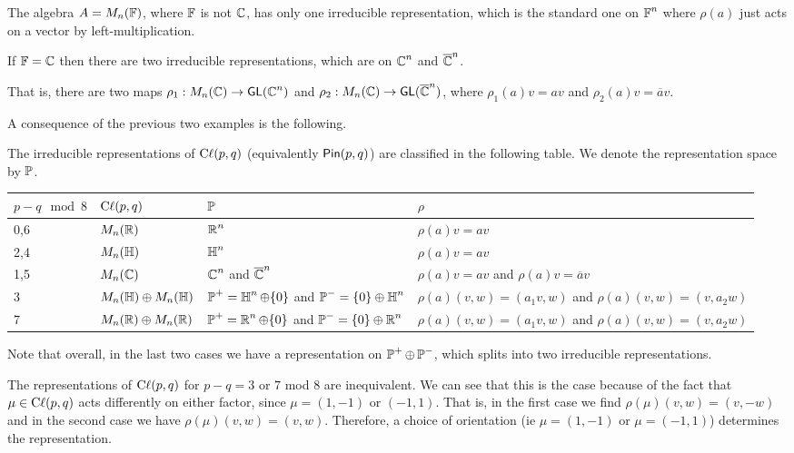 \begin{example}
    The algebra $A = M_n(\operatorname{\mathbb{F}})$, where $\operatorname{\mathbb{F}}$ is not $\operatorname{\mathbb{C}}$, has only one irreducible representation, which is the standard one on $\operatorname{\mathbb{F}}^n$ where $\rho(a)$ just acts on a vector by left-multiplication.
\end{example}
\begin{example}
    If $\operatorname{\mathbb{F}} = \operatorname{\mathbb{C}}$ then there are two irreducible representations, which are on $\operatorname{\mathbb{C}}^n$ and $\overline{\operatorname{\mathbb{C}}}^n$.
    
    That is, there are two maps $\rho_1 : M_n(\operatorname{\mathbb{C}}) \to \operatorname{\textsf{GL}}(\operatorname{\mathbb{C}}^n)$ and $\rho_2 : M_n(\operatorname{\mathbb{C}})\to \operatorname{\textsf{GL}}(\overline{\operatorname{\mathbb{C}}}^n)$, where $\rho_1(a)v = av$ and $\rho_2(a)v=\overline{a}v$.
\end{example}
A consequence of the previous two examples is the following.

\begin{thm} The irreducible representations of $\operatorname{C\ell}(p,q)$ (equivalently $\operatorname{\textsf{Pin}}(p,q)$) are classified in the following table. We denote the representation space by $\operatorname{\mathbb{P}}$.
\begin{center}
\begin{tabular}{llll}
$p-q\mod 8$ & $\operatorname{C\ell}(p,q)$                & $\operatorname{\mathbb{P}}$                          & $\rho$                                              \\ \hline
0,6         & $M_n(\operatorname{\mathbb{R}})$                & $\operatorname{\mathbb{R}}^n$                        & $\rho(a)v=av$                                       \\
2,4         & $M_n(\operatorname{\mathbb{H}})$                & $\operatorname{\mathbb{H}}^n$                        & $\rho(a)v=av$                                       \\
1,5         & $M_n(\operatorname{\mathbb{C}})$                & $\operatorname{\mathbb{C}}^n$ and $\overline{\operatorname{\mathbb{C}}}^n$ & $\rho(a)v=av$ and $\rho(a)v=\overline{a}v$          \\
3           & $M_n(\operatorname{\mathbb{H}})\oplus M_n(\operatorname{\mathbb{H}})$ & $\operatorname{\mathbb{P}}^+ = \operatorname{\mathbb{H}}^n\oplus \{0\}$ and $\operatorname{\mathbb{P}}^- = \{0\}\oplus \operatorname{\mathbb{H}}^n$            & $\rho(a)(v,w) = (a_1v,w)$ and $\rho(a)(v,w) = (v,a_2w)$ \\
7           & $M_n(\operatorname{\mathbb{R}})\oplus M_n(\operatorname{\mathbb{R}})$ & $\operatorname{\mathbb{P}}^+ = \operatorname{\mathbb{R}}^n\oplus\{0\}$ and $\operatorname{\mathbb{P}}^- = \{0\}\oplus \operatorname{\mathbb{R}}^n$             & $\rho(a)(v,w) = (a_1v,w)$ and $\rho(a)(v,w) = (v,a_2w)$
\end{tabular}
\end{center}
Note that overall, in the last two cases we have a representation on $\operatorname{\mathbb{P}}^+ \oplus \operatorname{\mathbb{P}}^-$, which splits into two irreducible representations.
\end{thm}
\begin{remark*}
    The representations of $\operatorname{C\ell}(p,q)$ for $p-q=3$ or $7$ mod $8$ are inequivalent. We can see that this is the case because of the fact that $\mu \in \operatorname{C\ell}(p,q)$ acts differently on either factor, since $\mu=(1,-1)$ or $(-1,1)$. That is, in the first case we find $\rho(\mu)(v,w) = (v,-w)$ and in the second case we have $\rho(\mu)(v,w) = (v,w)$. Therefore, a choice of orientation (ie $\mu = (1,-1)$ or $\mu=(-1,1)$) determines the representation. 
\end{remark*}
